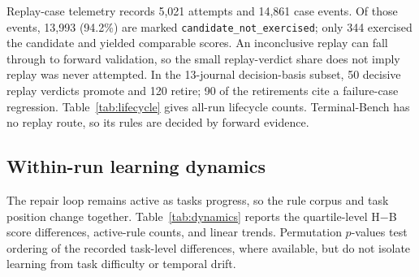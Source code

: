 \documentclass[11pt,letterpaper]{article}
\begin{document}
Replay-case telemetry records 5,021 attempts
and 14,861 case events. Of those events, 13,993 (94.2\%) are marked
\texttt{candidate\_not\_exercised}; only 344 exercised the candidate and
yielded comparable scores. An inconclusive replay can fall through to
forward validation, so the small replay-verdict share does not imply replay
was never attempted. In the 13-journal decision-basis subset, 50 decisive
replay verdicts promote and 120 retire; 90 of the retirements cite a
failure-case regression. Table~\ref{tab:lifecycle} gives all-run lifecycle
counts. Terminal-Bench has no replay route, so its rules are decided by
forward evidence.

\subsection{Within-run learning dynamics}
\label{sec:dynamics}
The repair loop remains active as tasks progress, so the rule corpus and
task position change together. Table~\ref{tab:dynamics} reports the
quartile-level H$-$B score differences, active-rule counts,
and linear trends. Permutation $p$-values test ordering of the recorded
task-level differences, where available, but do not isolate learning
from task difficulty or temporal drift.
\end{document}
